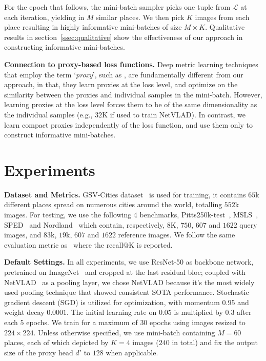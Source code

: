 \documentclass{bmvc2k}
\begin{document}
For the epoch that follows, the mini-batch sampler picks one tuple from $\mathcal{L}$ at each iteration, yielding in $M$ similar places. We then pick $K$ images from each place resulting in highly informative mini-batches of size $M \times K$. Qualitative results in section~\ref{ssec:qualitative} show the effectiveness of our approach in constructing informative mini-batches. 

\vspace{5pt}
\noindent\textbf{Connection to proxy-based loss functions.} Deep metric learning techniques that employ the term ‘\textit{proxy}’, such as \cite{kim2020proxy, yang2022hierarchical, yao2022pcl}, are fundamentally different from our approach, in that, they learn proxies at the loss level, and optimize on the similarity between the proxies and individual samples in the mini-batch. However, learning proxies at the loss level forces them to be of the same dimensionality as the individual samples (e.g., $32$K if used to train NetVLAD). In contrast, we learn compact proxies independently of the loss function, and use them only to construct informative mini-batches.
\section{Experiments}\label{sec:exp}
\textbf{Dataset and Metrics.} GSV-Cities dataset~\cite{ali2022gsv} is used for training, it contains $65$k different places spread on numerous cities around the world, totalling $552$k images. For testing, we use the following $4$ benchmarks,  Pitts250k-test~\cite{torii2013visual}, MSLS~\cite{warburg2020mapillary}, SPED~\cite{zaffar2021vpr} and Nordland~\cite{zaffar2021vpr} which contain, respectively, $8$K, $750$, $607$ and $1622$ query images, and $83$k, $19$k, $607$ and $1622$ reference images. We follow the same evaluation metric as~\cite{arandjelovic2016netvlad, warburg2020mapillary, zaffar2021vpr} where the recall@K is reported.

\noindent\textbf{Default Settings.}
In all experiments, we use ResNet-50\cite{he2016deep} as backbone network, pretrained on ImageNet~\cite{krizhevsky2012imagenet} and cropped at the last residual bloc; coupled with NetVLAD~\cite{arandjelovic2016netvlad} as a pooling layer, we chose NetVLAD because it's the most widely used pooling technique that showed consistent SOTA performance. Stochastic gradient descent (SGD) is utilized for optimization, with momentum $0.95$ and weight decay $0.0001$. The initial learning rate on $0.05$ is multiplied by $0.3$ after each $5$ epochs. We train for a maximum of $30$ epochs using images resized to $224\times 224$.
Unless otherwise specified, we use mini-batch containing $M=60$ places, each of which depicted by $K=4$ images ($240$ in total) and fix the output size of the proxy head $d'$ to $128$ when applicable.
\end{document}
